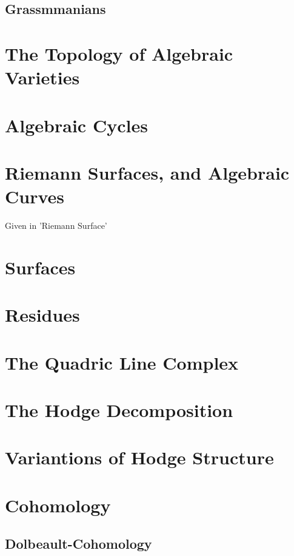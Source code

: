 \documentclass[Total.tex]{subfiles}
\begin{document}
		\section{Grassmmanians}
	\chapter{The Topology of Algebraic Varieties}
	\chapter{Algebraic Cycles}
	\chapter{Riemann Surfaces, and Algebraic Curves}
		Given in 'Riemann Surface'
	\chapter{Surfaces}
	\chapter{Residues}
	\chapter{The Quadric Line Complex}
	\chapter{The Hodge Decomposition}
	\chapter{Variantions of Hodge Structure	}
	\chapter{Cohomology}
		\section{Dolbeault-Cohomology}
\end{document}
